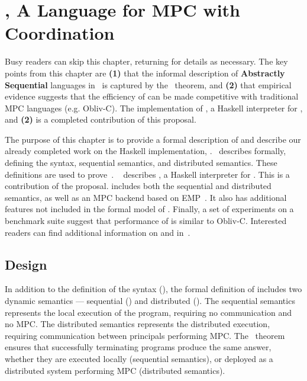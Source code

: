 \chapter{\mpc, A Language for MPC with Coordination}
\label{ch:mpc}

Busy readers can skip this chapter, returning for details as necessary. The key points from this chapter are
\textbf{(1)} that the informal description of \textbf{Abstractly Sequential} languages in~ is captured
by the~ theorem, and \textbf{(2)} that empirical evidence suggests that
the efficiency of \mpc can be made competitive with traditional MPC languages (e.g. Obliv-C). The implementation
of \system, a Haskell interpreter for \mpc, and \textbf{(2)} is a completed contribution of this proposal.

The purpose of this chapter is to provide a formal description of \mpc and describe our already completed work
on the Haskell implementation, \system.~ describes \mpc formally, defining the syntax,
sequential semantics, and distributed semantics. These definitions are used to prove~.
~ describes \system, a Haskell interpreter for \mpc. This is a contribution of the proposal.
\system includes both the sequential and distributed semantics, as well as an MPC backend based on EMP~\cite{emp-toolkit}.
It also has additional features not included in the formal model of \mpc. Finally, a set of experiments on a
benchmark suite suggest that performance of \system is similar to Obliv-C. Interested readers can find additional
information on \mpc and \system in~\citet{symphony22}.

\section{Design}
\label{sec:mpc-design}

In addition to the definition of the syntax (), the formal definition of \mpc
includes two dynamic semantics --- sequential () and distributed ().
The sequential semantics represents the local execution of the program, requiring no communication
and no MPC. The distributed semantics represents the distributed execution, requiring communication
between principals performing MPC. The~ theorem ensures that successfully
terminating programs produce the same answer, whether they are executed locally (sequential semantics),
or deployed as a distributed system performing MPC (distributed semantics).

